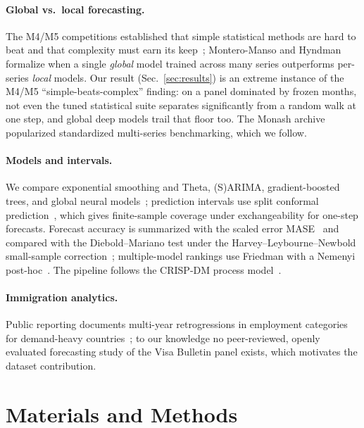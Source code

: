 \documentclass[runningheads]{llncs}
\begin{document}
\paragraph{Global vs.\ local forecasting.} The M4/M5 competitions established that
simple statistical methods are hard to beat and that complexity must earn its
keep~\cite{makridakis2020,makridakis2022}; Montero-Manso and Hyndman~\cite{montero2021}
formalize when a single \emph{global} model trained across many series outperforms
per-series \emph{local} models. Our result (Sec.~\ref{sec:results}) is an extreme
instance of the M4/M5 ``simple-beats-complex'' finding: on a panel dominated by
frozen months, not even the tuned statistical suite separates significantly from a
random walk at one step, and global deep models trail that floor too. The Monash
archive~\cite{godahewa2021} popularized standardized multi-series benchmarking,
which we follow.

\paragraph{Models and intervals.} We compare exponential smoothing and Theta,
(S)ARIMA, gradient-boosted trees, and global neural
models~\cite{salinas2020,oreshkin2020,nie2023}; prediction intervals use split conformal
prediction~\cite{vovk2005,romano2019}, which gives finite-sample coverage under
exchangeability for one-step forecasts. Forecast accuracy is summarized with the
scaled error MASE~\cite{hyndman2006} and compared with the Diebold--Mariano test
under the Harvey--Leybourne--Newbold small-sample correction~\cite{diebold1995,harvey1997};
multiple-model rankings use Friedman with a Nemenyi post-hoc~\cite{demsar2006}. The
pipeline follows the CRISP-DM process model~\cite{chapman2000}.

\paragraph{Immigration analytics.} Public reporting documents multi-year
retrogressions in employment categories for demand-heavy countries~\cite{bier2023};
to our knowledge no peer-reviewed, openly evaluated forecasting study of the Visa
Bulletin panel exists, which motivates the dataset contribution.

\section{Materials and Methods}
\label{sec:methods}
\end{document}
